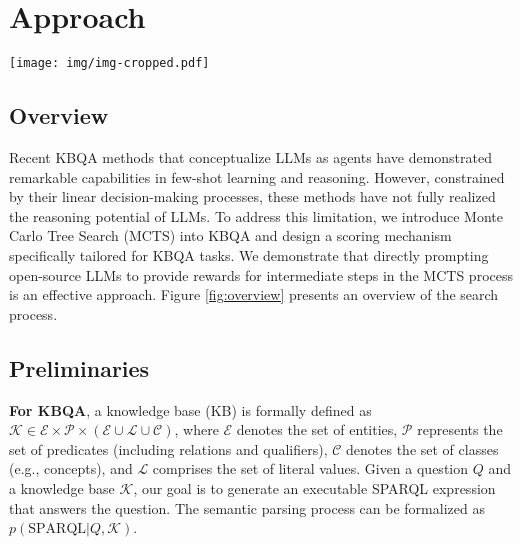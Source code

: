\section{Approach}

\begin{figure*}[htbp]
  \centering
  \texttt{[image: img/img-cropped.pdf]}
  \caption{Overview of the MCTS process.}
  \label{fig:overview}
\end{figure*}

\subsection{Overview}

Recent KBQA methods that conceptualize LLMs as agents have demonstrated remarkable capabilities in few-shot learning and reasoning.
However, constrained by their linear decision-making processes, these methods have not fully realized the reasoning potential of LLMs.
To address this limitation, we introduce Monte Carlo Tree Search (MCTS) into KBQA and design a scoring mechanism specifically tailored for KBQA tasks.
We demonstrate that directly prompting open-source LLMs to provide rewards for intermediate steps in the MCTS process is an effective approach.
Figure \ref{fig:overview} presents an overview of the search process.

\subsection{Preliminaries}

\textbf{For KBQA}, a knowledge base (KB) is formally defined as $\mathcal{K} \in \mathcal{E} \times \mathcal{P} \times (\mathcal{E} \cup \mathcal{L} \cup \mathcal{C})$, where $\mathcal{E}$ denotes the set of entities, $\mathcal{P}$ represents the set of predicates (including relations and qualifiers), $\mathcal{C}$ denotes the set of classes (e.g., concepts), and $\mathcal{L}$ comprises the set of literal values.
Given a question $Q$ and a knowledge base $\mathcal{K}$, our goal is to generate an executable SPARQL expression that answers the question.
The semantic parsing process can be formalized as $p(\text{SPARQL} | Q, \mathcal{K})$.

